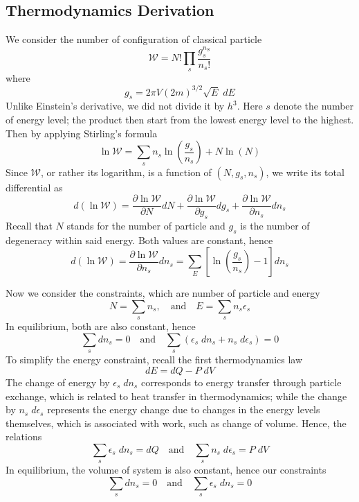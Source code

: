 \documentclass[../../../Main.tex]{subfiles}
\begin{document}
\subsection*{Thermodynamics Derivation}
We consider the number of configuration of classical particle
\begin{equation*}
    \mathcal{W}=N! \prod_{s} \frac{g_s^{n_S}}{n_s!}
\end{equation*}
where 
\begin{equation*}
    g_s=2\pi V(2m)^{3/2}\sqrt{E}\;dE
\end{equation*}
Unlike Einstein's derivative, we did not divide it by $h^3$. Here $s$ denote the number of energy level; the product then start from the lowest energy level to the highest. Then by applying Stirling's formula
\begin{equation*}
    \ln \mathcal{W}=\sum_s n_s \ln \left(\frac{g_s}{n_s}\right)+ N\ln (N)
\end{equation*}
Since $\mathcal{W}$, or rather its logarithm, is a function of $(N,g_s,n_s)$, we write its total differential as 
\begin{equation*}
    d(\ln \mathcal{W})=\frac{\partial \ln \mathcal{W}}{\partial N}dN+\frac{\partial \ln \mathcal{W}}{\partial g_s}dg_s+ \frac{\partial \ln \mathcal{W}}{\partial n_s}dn_s
\end{equation*} 
Recall that $N$ stands for the number of particle and $g_s$ is the number of degeneracy within said energy. Both values are constant, hence
\begin{equation*}
    d(\ln \mathcal{W})=\frac{\partial \ln \mathcal{W}}{\partial n_s}dn_s=\sum_E \left[\ln \left(\frac{g_s}{n_s}\right)-1 \right] dn_s
\end{equation*}

Now we consider the constraints, which are number of particle and energy
\begin{equation*}
    N=\sum_s n_s,\quad\text{and}\quad E=\sum_s n_s\epsilon_s 
\end{equation*}
In equilibrium, both are also constant, hence
\begin{equation*}
    \sum_s dn_s=0 \quad\text{and}\quad\sum_s \left( \epsilon_s \;dn_s +n_s\;d\epsilon_s \right)=0
\end{equation*}
To simplify the energy constraint, recall the first thermodynamics law
\begin{equation*}
    dE=dQ-P\;dV
\end{equation*} 
The change of energy by $\epsilon_s \;dn_s $ corresponds to energy transfer through particle exchange, which is related to heat transfer in thermodynamics; while the change by $n_s\;d\epsilon_s$ represents the energy change due to changes in the energy levels themselves, which is associated with work, such as change of volume. Hence, the relations 
\begin{equation*}
    \sum_s\epsilon_s \;dn_s=dQ \quad\text{and}\quad\sum_s n_s\;d\epsilon_s =P\;dV
\end{equation*}
In equilibrium, the volume of system is also constant, hence our constraints
\begin{equation*}
    \sum_s dn_s=0 \quad\text{and}\quad \sum_s\epsilon_s \;dn_s=0
\end{equation*}
\end{document}

